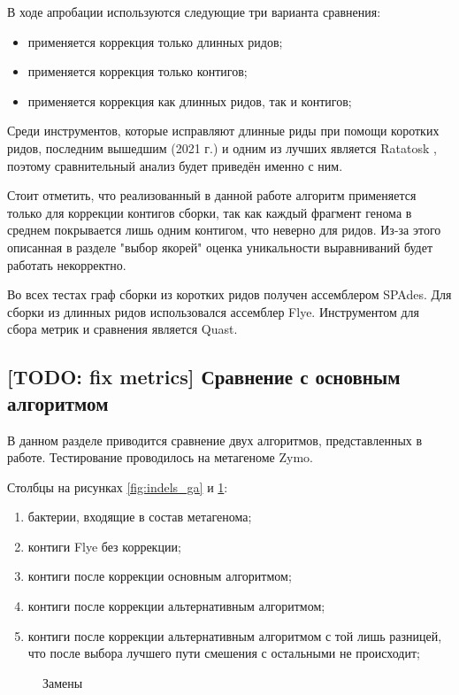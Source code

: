 \documentclass[14pt]{matmex-diploma-custom}
\begin{document}
В ходе апробации используются следующие три варианта сравнения:
\begin{itemize}
    \item применяется коррекция только длинных ридов;
    \item применяется коррекция только контигов;
    \item применяется коррекция как длинных ридов, так и контигов;
\end{itemize}

Среди инструментов, которые исправляют длинные риды при помощи коротких ридов, последним вышедшим (2021 г.) и одним из лучших является Ratatosk \cite{art:holley2021ratatosk, art:zhang2020comprehensive, art:fu2019comparative}, поэтому сравнительный анализ будет приведён именно с ним.

Стоит отметить, что реализованный в данной работе алгоритм применяется только для коррекции контигов сборки, так как каждый фрагмент генома в среднем покрывается лишь одним контигом, что неверно для ридов. Из-за этого описанная в разделе "выбор якорей" оценка уникальности выравниваний будет работать некорректно.

Во всех тестах граф сборки из коротких ридов получен ассемблером SPAdes. Для сборки из длинных ридов использовался ассемблер Flye. Инструментом для сбора метрик и сравнения является Quast.

\subsection{[TODO: fix metrics] Сравнение с основным алгоритмом }
В данном разделе приводится сравнение двух алгоритмов, представленных в работе. Тестирование проводилось на метагеноме Zymo.

Столбцы на рисунках \ref{fig:indels_ga} и \ref{fig:mismatches_ga}:
\begin{enumerate}
    \item бактерии, входящие в состав метагенома;
    \item контиги Flye без коррекции;
    \item контиги после коррекции основным алгоритмом;
    \item контиги после коррекции альтернативным алгоритмом;
    \item контиги после коррекции альтернативным алгоритмом с той лишь разницей, что после выбора лучшего пути смешения с остальными не происходит;
\end{enumerate}

\begin{figure}[h]
    \centering
    
    \caption{Замены}
    \label{fig:mismatches_ga}
\end{figure}
\end{document}
